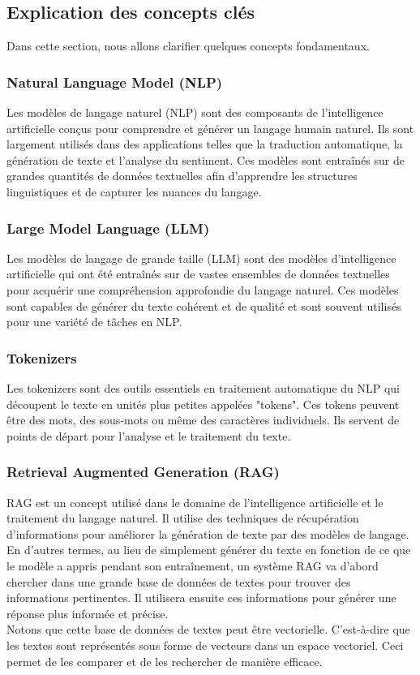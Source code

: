 \subsection{Explication des concepts clés}
\justifying
Dans cette section, nous allons clarifier quelques concepts fondamentaux.

\subsubsection{Natural Language Model (NLP)}
\justifying
Les modèles de langage naturel (NLP) sont des composants de l'intelligence artificielle conçus pour comprendre et générer un langage humain naturel. Ils sont largement utilisés dans des applications telles que la traduction automatique, la génération de texte et l'analyse du sentiment. Ces modèles sont entraînés sur de grandes quantités de données textuelles afin d'apprendre les structures linguistiques et de capturer les nuances du langage.

\subsubsection{Large Model Language (LLM)}
\justifying
Les modèles de langage de grande taille (LLM) sont des modèles d'intelligence artificielle qui ont été entraînés sur de vastes ensembles de données textuelles pour acquérir une compréhension approfondie du langage naturel. Ces modèles sont capables de générer du texte cohérent et de qualité et sont souvent utilisés pour une variété de tâches en NLP.

\subsubsection{Tokenizers}
\justifying
Les tokenizers sont des outils essentiels en traitement automatique du NLP qui découpent le texte en unités plus petites appelées "tokens". Ces tokens peuvent être des mots, des sous-mots ou même des caractères individuels. Ils servent de points de départ pour l'analyse et le traitement du texte.

\subsubsection{Retrieval Augmented Generation (RAG) }
RAG est un concept utilisé dans le domaine de l'intelligence artificielle et le traitement du langage naturel. Il utilise des techniques de récupération d'informations pour améliorer la génération de texte par des modèles de langage. \\
En d'autres termes, au lieu de simplement générer du texte en fonction de ce que le modèle a appris pendant son entraînement, un système RAG va d'abord chercher dans une grande base de données de textes pour trouver des informations pertinentes. Il utilisera ensuite ces informations pour générer une réponse plus informée et précise.\\
Notons que cette base de données de textes peut être vectorielle. C'est-à-dire que les textes sont représentés sous forme de vecteurs dans un espace vectoriel. Ceci permet de les comparer et de les rechercher de manière efficace.

